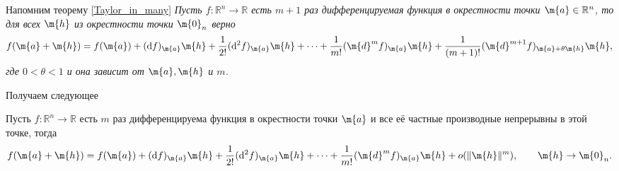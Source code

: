 Напомним теорему \ref{Taylor_in_many}
\textit{Пусть $f:\mathbb{R}^n \to \mathbb{R}$ есть $m+1$ раз дифференцируемая функция в окрестности точки $\m{a} \in \mathbb{R}^n$, то для всех $\m{h}$ из окрестности точки $\m{0}_n$ верно 
    \[
     f(\m{a} + \m{h}) = f(\m{a}) + (\mathrm{d}f)_\m{a} \m{h} + \frac{1}{2!} (\mathrm{d}^2f)_\m{a}\m{h} + \cdots + \frac{1}{m!} (\m{d}^mf)_\m{a}\m{h} + \frac{1}{(m+1)!} (\m{d}^{m+1}f)_{\m{a}+ \theta \m{h}}\m{h},
    \]
    где $0 < \theta < 1$ и она зависит от $\m{a}, \m{h}$ и $m$.
}

Получаем следующее
\begin{corollary}\label{cor_for_Peano_in_many}
    Пусть $f:\mathbb{R}^n \to \mathbb{R}$ есть $m$ раз дифференцируема функция в окрестности точки $\m{a}$ и все её частные производные непрерывны в этой точке, тогда
    \[
     f(\m{a} + \m{h}) = f(\m{a}) + (\mathrm{d}f)_\m{a} \m{h} + \frac{1}{2!} (\mathrm{d}^2f)_\m{a}\m{h} + \cdots + \frac{1}{m!} (\m{d}^mf)_\m{a}\m{h} + o(\| \m{h} \|^m), \qquad \m{h} \to \m{0}_n.
    \]
\end{corollary}

